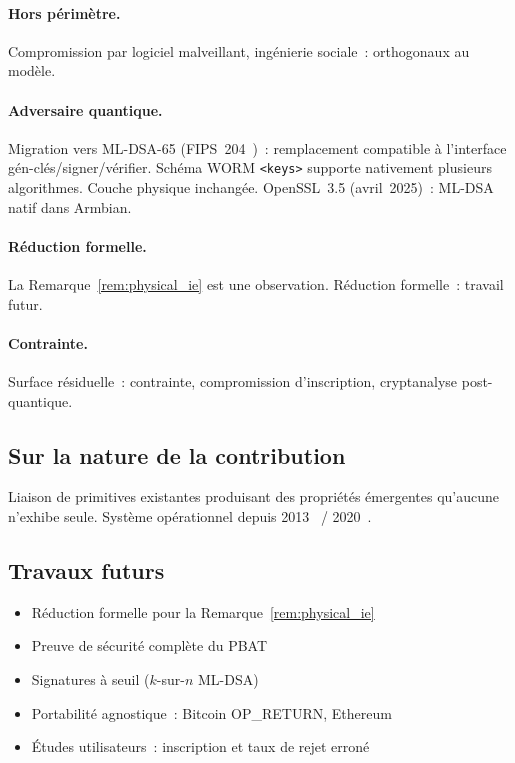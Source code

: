 \documentclass[11pt,a4paper]{article}
\theoremstyle{definition}
\newcommand{\PBAT}{\textsf{PBAT}}
\begin{document}
\paragraph{Hors périmètre.} Compromission par logiciel malveillant,
ingénierie sociale~: orthogonaux au modèle.

\paragraph{Adversaire quantique.} Migration vers ML-DSA-65
(FIPS~204~\cite{FIPS204})~: remplacement compatible à l'interface
gén-clés/signer/vérifier. Schéma WORM \texttt{<keys>} supporte
nativement plusieurs algorithmes. Couche physique inchangée.
OpenSSL~3.5 (avril~2025)~: ML-DSA natif dans Armbian.

\paragraph{Réduction formelle.} La Remarque~\ref{rem:physical_ie}
est une observation. Réduction formelle~: travail futur.

\paragraph{Contrainte.} Surface résiduelle~: contrainte,
compromission d'inscription, cryptanalyse post-quantique.

\subsection{Sur la nature de la contribution}

Liaison de primitives existantes produisant des propriétés émergentes
qu'aucune n'exhibe seule. Système opérationnel depuis
2013~\cite{Emercoin} / 2020~\cite{DPO}.

\subsection{Travaux futurs}

\begin{itemize}
  \item Réduction formelle pour la Remarque~\ref{rem:physical_ie}
  \item Preuve de sécurité complète du \PBAT{}
  \item Signatures à seuil ($k$-sur-$n$ ML-DSA)
  \item Portabilité agnostique~: Bitcoin OP\_RETURN, Ethereum
  \item Études utilisateurs~: inscription et taux de rejet erroné
\end{itemize}
\end{document}
